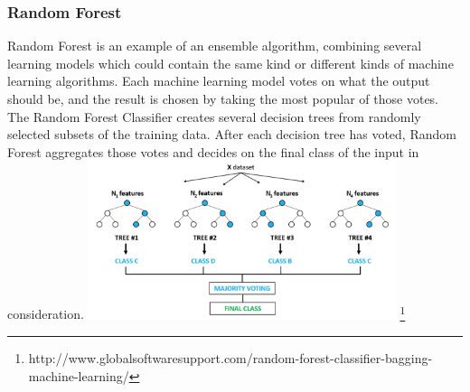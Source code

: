 \documentclass{article}
\begin{document}
            \subsubsection{Random Forest}
            Random Forest is an example of an ensemble algorithm, combining several learning 
            models which could contain the same kind or different kinds of machine learning algorithms. Each machine learning model votes on what the output should be, and the result is chosen by taking the most popular of those votes. The Random Forest Classifier creates several decision trees from randomly selected subsets of the training data. After each decision tree has voted, Random Forest aggregates those votes and decides on the final class of the input in consideration.
            \includegraphics[width=9cm]{graphs/Random_Forest_description}
            \footnote{http://www.globalsoftwaresupport.com/random-forest-classifier-bagging-machine-learning/}
\end{document}
